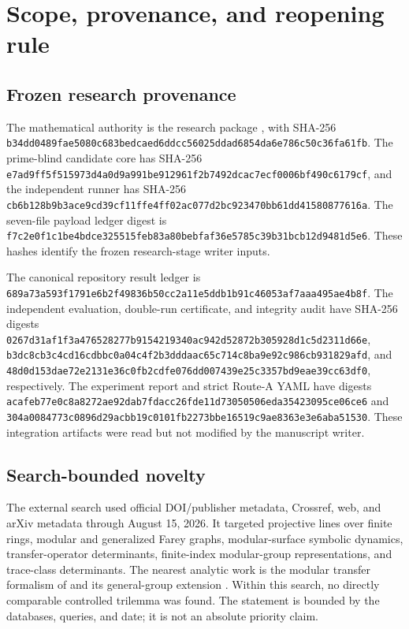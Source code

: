 \section{Scope, provenance, and reopening rule}
\label{app:scope}

\subsection{Frozen research provenance}

The mathematical authority is the research package
, with SHA-256
\nolinkurl{b34dd0489fae5080c683bedcaed6ddcc56025ddad6854da6e786c50c36fa61fb}.
The prime-blind candidate core has SHA-256
\nolinkurl{e7ad9ff5f515973d4a0d9a991be912961f2b7492dcac7ecf0006bf490c6179cf},
and the independent runner has SHA-256
\nolinkurl{cb6b128b9b3ace9cd39cf11ffe4ff02ac077d2bc923470bb61dd41580877616a}.
The seven-file payload ledger digest is
\nolinkurl{f7c2e0f1c1be4bdce325515feb83a80bebfaf36e5785c39b31bcb12d9481d5e6}.
These hashes identify the frozen research-stage writer inputs.

The canonical repository result ledger is
\nolinkurl{689a73a593f1791e6b2f49836b50cc2a11e5ddb1b91c46053af7aaa495ae4b8f}.
The independent evaluation, double-run certificate, and integrity audit have
SHA-256 digests
\nolinkurl{0267d31af1f3a476528277b9154219340ac942d52872b305928d1c5d2311d66e},
\nolinkurl{b3dc8cb3c4cd16cdbbc0a04c4f2b3dddaac65c714c8ba9e92c986cb931829afd},
and
\nolinkurl{48d0d153dae72e2131e36c0fb2cdfe076dd007439e25c3357bd9eae39cc63df0},
respectively.  The experiment report and strict Route-A YAML have digests
\nolinkurl{acafeb77e0c8a8272ae92dab7fdacc26fde11d73050506eda35423095ce06ce6}
and
\nolinkurl{304a0084773c0896d29acbb19c0101fb2273bbe16519c9ae8363e3e6aba51530}.
These integration artifacts were read but not modified by the manuscript
writer.

\subsection{Search-bounded novelty}

The external search used official DOI/publisher metadata, Crossref, web, and
arXiv metadata through August 15, 2026.  It targeted projective lines over
finite rings, modular and generalized Farey graphs, modular-surface symbolic
dynamics, transfer-operator determinants, finite-index modular-group
representations, and trace-class determinants.  The nearest analytic work is
the modular transfer formalism of \citet{mayer1991thermodynamic} and its
general-group extension \citep{chang2001extension}.  Within this search, no
directly comparable controlled trilemma was found.  The statement is bounded
by the databases, queries, and date; it is not an absolute priority claim.

